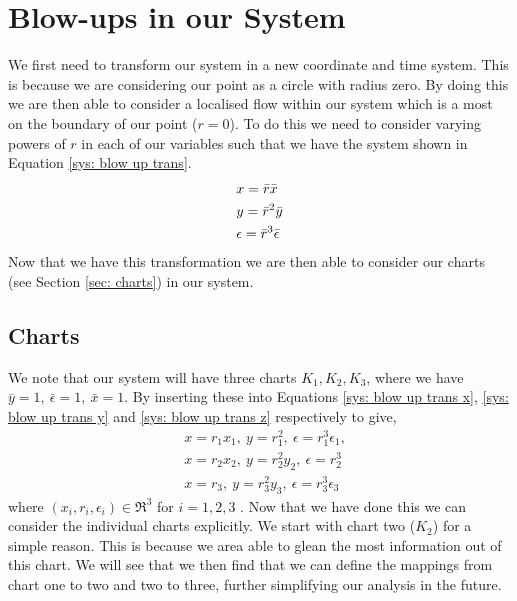 \documentclass{article}
\newcommand{\st}{such that }
\begin{document}
\section{Blow-ups in our System}\label{sec: VDP Blowup}
We first need to transform our system in a new coordinate and time system. This is because we are considering our point as a circle with radius zero. By doing this we are then able to consider a localised flow within our system which is a most on the boundary of our point ($r=0$). To do this we need to consider varying powers of $r$ in each of our variables \st we have the system shown in Equation \ref{sys: blow up trans}.  
\begin{subequations}
    \begin{align}
        &x=\Bar{r}\Bar{x}  \label{sys: blow up trans x}\\
        &y=\Bar{r}^2\Bar{y} \label{sys: blow up trans y}\\ 
        &\epsilon=\bar{r}^3\bar{\epsilon} \label{sys: blow up trans z}
    \end{align}  
    \label{sys: blow up trans}
\end{subequations}
Now that we have this transformation we are then able to consider our charts (see Section \ref{sec: charts}) in our system.

\subsection{Charts}
We note that our system will have three charts $ K_1,K_2,K_3 $, where we have $ \bar{y}=1, \ \bar{\epsilon}=1, \ \bar{x}=1 $. By inserting these into Equations \ref{sys: blow up trans x}, \ref{sys: blow up trans y} and \ref{sys: blow up trans z} respectively to give, 
\begin{subequations}
	\begin{align}
	&x=r_1x_1, \ y=r_1^2, \ \epsilon=r_1^3\epsilon_1,\\
	&x=r_2x_2, \ y=r_2^2y_2, \ \epsilon=r_2^3 \label{sys: K2}\\
	&x=r_3, \ y=r_3^2y_3, \ \epsilon=r_3^3\epsilon_3\label{sys:K3}
	\end{align}
\end{subequations}
where $ (x_i,r_i,\epsilon_i)\in\Re^3 $ for $ i=1,2,3 $ \citep{krupa2001}. Now that we have done this we can consider the individual charts explicitly. We start with chart two ($K_2$) for a simple reason. This is because we area able to glean the most information out of this chart. We will see that we then find that we can define the mappings from chart one to two and two to three, further simplifying our analysis in the future.
\end{document}
